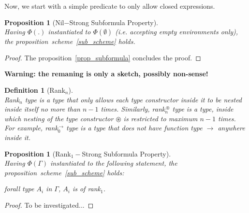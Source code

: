 \documentclass[11p,a4paper]{article}
\newcommand{\typecolor}{}
\newcommand{\tp}[1]{{\typecolor #1}}
\newtheorem{proposition}[theorem]{Proposition}
\newtheorem{definition}{Definition}
\newcommand{\typarr}[2]{#1\boldsymbol{\rightarrow}#2}
\newcommand{\envemp}{\tp{\boldsymbol{\emptyset}}}
\begin{document}
Now, we start with a simple predicate to only allow closed expressions.
 
\begin{proposition}[Nil$-$Strong Subformula Property]\ \\
Having $\Phi(.)$ instantiated to $\Phi(\envemp)$ (i.e. accepting empty environments only), the
proposition~scheme~\ref{sub_scheme} holds.
\end{proposition}
\begin{proof}
The proposition~\ref{prop_subformula} concludes the proof.
\end{proof}

\textbf{Warning: the remaning is only a sketch, possibly non-sense!}

\begin{definition}[Rank$_n$]\ \\
Rank$_n$ type is a type that only allows each type constructor inside
it to be nested inside itself no more than $n - 1$ times. Similarly,
rank$_{n}^{\,\circledast}$ type is a type, inside which nesting of the
type constructor $\circledast$ is restricted to maximum $n - 1$ times.
For example, rank$_{0}^{\,\typarr{}{}}$ type is a type that does not have
function type $\typarr{}{}$ anywhere inside it.
\end{definition}

\begin{proposition}[Rank$_{1}-$Strong Subformula Property]\ \\
Having $\Phi(\Gamma)$ instantiated to the following statement, the
proposition~scheme~\ref{sub_scheme} holds:
 
 forall type $A_i$ in $\Gamma$, $A_i$ is of rank$_{1}$.
 
\end{proposition}
\begin{proof}
To be investigated...
\end{proof}

 
\end{document}
